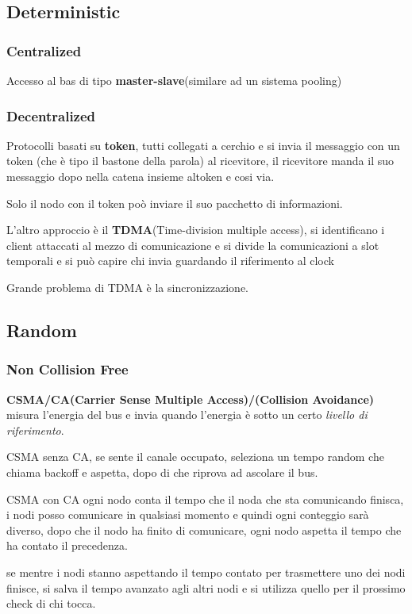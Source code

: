 \subsection{Deterministic}
\subsubsection{Centralized}
Accesso al bas di tipo \textbf{master-slave}(similare ad un sistema pooling)
\subsubsection{Decentralized}

Protocolli basati su \textbf{token}, tutti collegati a cerchio e si invia il messaggio con un token (che è tipo il bastone della parola) al ricevitore, il ricevitore manda il suo messaggio dopo nella catena insieme altoken e cosi via.

Solo il nodo con il token poò inviare il suo pacchetto di informazioni.


L'altro approccio è il \textbf{TDMA}(Time-division multiple access), si identificano i client attaccati al mezzo di comunicazione e si divide la comunicazioni a slot temporali e si può capire chi invia guardando il riferimento al clock

Grande problema di TDMA è la sincronizzazione.


\subsection{Random}
\subsubsection{Non Collision Free}
\textbf{CSMA/CA(Carrier Sense Multiple Access)/(Collision Avoidance)} misura l'energia del bus e invia quando l'energia è sotto un certo \textit{livello di riferimento}.

CSMA senza CA, se sente il canale occupato, seleziona un tempo random che chiama backoff e aspetta, dopo di che riprova ad ascolare il bus.

CSMA con CA ogni nodo conta il tempo che il noda che sta comunicando finisca, i nodi posso comunicare in qualsiasi momento e quindi ogni conteggio sarà diverso, dopo che il nodo ha finito di comunicare, ogni nodo aspetta il tempo che ha contato il precedenza.

se mentre i nodi stanno aspettando il tempo contato per trasmettere uno dei nodi finisce, si salva il tempo avanzato agli altri nodi e si utilizza quello per il prossimo check di chi tocca.

